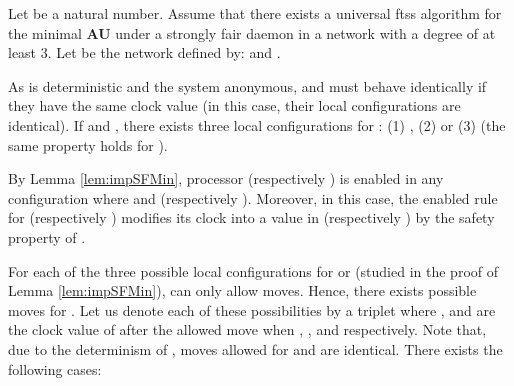 \documentclass[11pt,english,letterpaper]{article}
\newenvironment{proof}{{\noindent\bf Proof. } }{{\hfill }}
\begin{document}
\begin{proof}
Let  be a natural number. Assume that there exists a universal ftss algorithm  for the minimal \textbf{AU} under a strongly fair daemon in a network with a degree of at least 3. Let  be the network defined by:  and .

As  is deterministic and the system anonymous,  and  must behave identically if they have the same clock value (in this case, their local configurations are identical). If  and , there exists three local configurations for : (1) , (2)  or (3)  (the same property holds for ).

By Lemma \ref{lem:impSFMin}, processor  (respectively ) is enabled in any configuration where  and  (respectively ). Moreover, in this case, the enabled rule for  (respectively ) modifies its clock into a value in  (respectively ) by the safety property of .

For each of the three possible local configurations for  or  (studied in the proof of Lemma \ref{lem:impSFMin}),  can only allow  moves. Hence, there exists  possible moves for . Let us denote each of these possibilities by a triplet  where ,  and  are the clock value of  after the allowed move when , , and  respectively. Note that, due to the determinism of , moves allowed for  and  are identical. There exists the following cases:


\end{proof}
\end{document}
